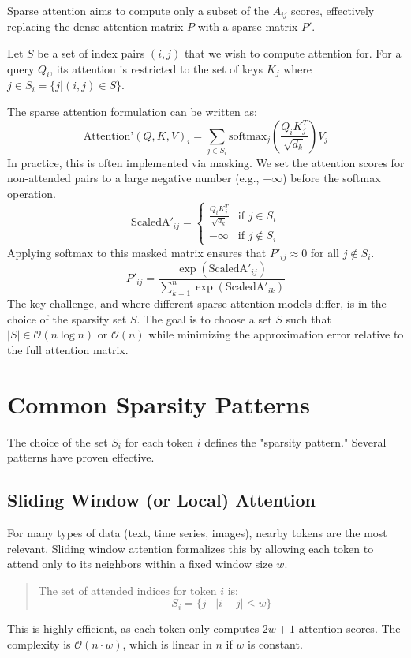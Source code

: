 \documentclass{article}
\begin{document}
Sparse attention aims to compute only a subset of the \(A_{ij}\) scores, effectively replacing the dense attention matrix \(P\) with a sparse matrix \(P'\).

Let \(S\) be a set of index pairs \((i, j)\) that we wish to compute attention for. For a query \(Q_i\), its attention is restricted to the set of keys \(K_j\) where \(j \in S_i = \{j | (i, j) \in S\}\).

The sparse attention formulation can be written as:
\[
\text{Attention'}(Q, K, V)_i = \sum_{j \in S_i} \text{softmax}_j\left(\frac{Q_i K_j^T}{\sqrt{d_k}}\right)V_j
\]
In practice, this is often implemented via masking. We set the attention scores for non-attended pairs to a large negative number (e.g., \(-\infty\)) before the softmax operation.
\[
\text{ScaledA}'_{ij} =
\begin{cases}
\frac{Q_i K_j^T}{\sqrt{d_k}} & \text{if } j \in S_i \\
-\infty & \text{if } j \notin S_i
\end{cases}
\]
Applying softmax to this masked matrix ensures that \(P'_{ij} \approx 0\) for all \(j \notin S_i\).
\[
P'_{ij} = \frac{\exp(\text{ScaledA}'_{ij})}{\sum_{k=1}^{n} \exp(\text{ScaledA}'_{ik})}
\]
The key challenge, and where different sparse attention models differ, is in the choice of the sparsity set \(S\). The goal is to choose a set \(S\) such that \(|S| \in \mathcal{O}(n \log n)\) or \(\mathcal{O}(n)\) while minimizing the approximation error relative to the full attention matrix.

\section{Common Sparsity Patterns}

The choice of the set \(S_i\) for each token \(i\) defines the "sparsity pattern." Several patterns have proven effective.

\subsection{Sliding Window (or Local) Attention}

For many types of data (text, time series, images), nearby tokens are the most relevant. Sliding window attention formalizes this by allowing each token to attend only to its neighbors within a fixed window size \(w\).
\begin{quote}
The set of attended indices for token \(i\) is:
\[
S_i = \{j \mid |i - j| \le w \}
\]
\end{quote}
This is highly efficient, as each token only computes \(2w+1\) attention scores. The complexity is \(\mathcal{O}(n \cdot w)\), which is linear in \(n\) if \(w\) is constant.
\end{document}
